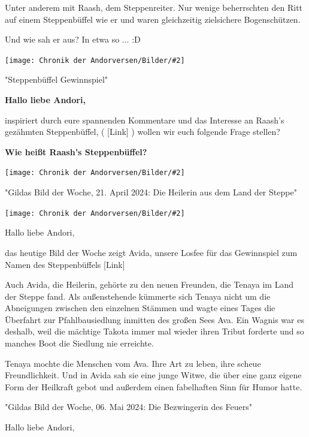 \documentclass[10pt, a4paper, oneside]{book}
\newcommand{\bildmitts}[2][height=0.32\textwidth,width=0.48\textwidth,keepaspectratio]{%
    \begin{center}
        \texttt{[image: Chronik der Andorversen/Bilder/\#2]}
    \end{center}
}
\begin{document}
\begin{multicols}{2}
Unter anderem mit Raash, dem Steppenreiter. Nur wenige beherrschten den Ritt auf einem Steppenbüffel wie er und waren gleichzeitig zielsichere Bogenschützen.

Und wie sah er aus? In etwa so ... :D

\bildmitts{Die Bezwingerin des Feuers 2.jpeg}



\begin{center}
    "Steppenbüffel Gewinnspiel"
\end{center}

\textbf{Hallo liebe Andori,}

inspiriert durch eure spannenden Kommentare und das Interesse an Raash's gezähmten Steppenbüffel, ( [Link] ) wollen wir euch folgende Frage stellen?

\textbf{Wie heißt Raash's Steppenbüffel?}

\bildmitts{Die Bezwingerin des Feuers 3.jpeg}



\begin{center}
    "Gildas Bild der Woche, 21. April 2024: Die Heilerin aus dem Land der Steppe"
\end{center}

\bildmitts{Die Bezwingerin des Feuers 4.jpeg}

Hallo liebe Andori,

das heutige Bild der Woche zeigt Avida, unsere Losfee für das Gewinnspiel zum Namen des Steppenbüffels [Link]

Auch Avida, die Heilerin, gehörte zu den neuen Freunden, die Tenaya im Land der Steppe fand. Als außenstehende kümmerte sich Tenaya nicht um die Abneigungen zwischen den einzelnen Stämmen und wagte eines Tages die Überfahrt zur Pfahlbausiedlung inmitten des großen Sees Ava. Ein Wagnis war es deshalb, weil die mächtige Takota immer mal wieder ihren Tribut forderte und so manches Boot die Siedlung nie erreichte.

Tenaya mochte die Menschen vom Ava. Ihre Art zu leben, ihre scheue Freundlichkeit. Und in Avida sah sie eine junge Witwe, die über eine ganz eigene Form der Heilkraft gebot und außerdem einen fabelhaften Sinn für Humor hatte.




\begin{center}
    "Gildas Bild der Woche, 06. Mai 2024: Die Bezwingerin des Feuers"
\end{center}

Hallo liebe Andori,


\end{multicols}
\end{document}
